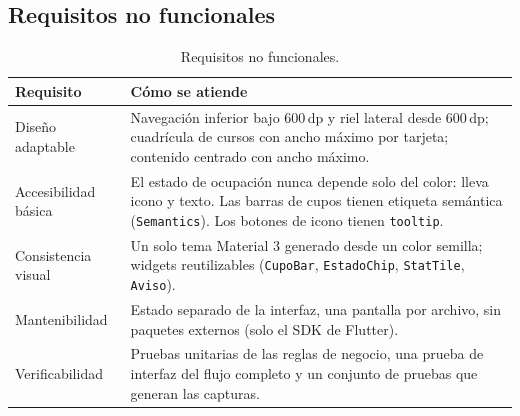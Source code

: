 \subsection{Requisitos no funcionales}
\begin{table}[H]
	\centering\footnotesize
	\begin{tabularx}{\textwidth}{|p{3.2cm}|X|}
		\hline
		\rowcolor{tablebackground}\color{white}\textbf{Requisito} & \color{white}\textbf{Cómo se atiende}\\
		\hline
		Diseño adaptable & Navegación inferior bajo 600\,dp y riel lateral desde 600\,dp; cuadrícula de cursos con ancho máximo por tarjeta; contenido centrado con ancho máximo. \\\hline
		Accesibilidad básica & El estado de ocupación nunca depende solo del color: lleva icono y texto. Las barras de cupos tienen etiqueta semántica (\texttt{Semantics}). Los botones de icono tienen \texttt{tooltip}. \\\hline
		Consistencia visual & Un solo tema Material 3 generado desde un color semilla; widgets reutilizables (\texttt{CupoBar}, \texttt{EstadoChip}, \texttt{StatTile}, \texttt{Aviso}). \\\hline
		Mantenibilidad & Estado separado de la interfaz, una pantalla por archivo, sin paquetes externos (solo el SDK de Flutter). \\\hline
		Verificabilidad & Pruebas unitarias de las reglas de negocio, una prueba de interfaz del flujo completo y un conjunto de pruebas que generan las capturas. \\\hline
	\end{tabularx}
	\caption{Requisitos no funcionales.}
	\label{tab:rnf}
\end{table}

